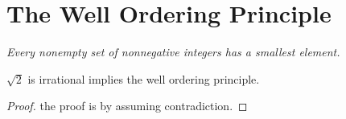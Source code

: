 \chapter{The Well Ordering Principle}

\begin{center}
    \emph{Every nonempty set of nonnegative integers has a smallest element.}
\end{center}

\begin{claim}
    $\sqrt{2}$ is irrational implies the well ordering principle.
\end{claim}

\begin{proof}
    the proof is by assuming contradiction.
\end{proof}

